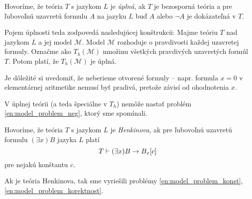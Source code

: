 \begin{definicia}
    Hovoríme, že teória $T$ s jazykom $L$ je \emph{úplná}, ak $T$ je
    bezosporná teória a pre ľubovoľnú uzavretú formulu $A$ na jazyku
    $L$ buď $A$ alebo $\neg A$ je dokázateľná v $T$.
\end{definicia}

\begin{poznamka}
    Pojem úplnosti teda zodpovedá nasledujúcej konštrukcii:
    Majme teóriu $T$ nad jazykom $L$ a jej model $\mathcal{M}$.
    Model $\mathcal{M}$ rozhoduje o pravdivosti každej uzavretej
    formuly.
    Označme ako $T_h(\mathcal{M})$ množinu všetkých
    pravdivých uzavretých formúl $T$.
    Potom platí, že $T_h(\mathcal{M})$ je úplná.

    Je dôležité si uvedomiť, že neberieme otvorené formuly --
    napr. formula $x=0$ v elementárnej aritmetike nemusí byť pradivá, 
    pretože závisí od ohodnotenia $x$.
\end{poznamka}

\begin{poznamka}
    V úplnej teórii (a teda špeciálne v $T_h$) nemôže nastať problém 
    \ref{en:model_problem_neg}, ktorý sme spomínali.
\end{poznamka}

\begin{definicia}
    Hovoríme, že teória $T$ s jazykom $L$ je \emph{Henkinova}, ak pre
    ľubovoľnú uzavretú formulu $(\exists x)B$ jazyka $L$ platí
    \begin{equation*}
        T \vdash (\exists x)B \rightarrow B_x[c]
    \end{equation*}
    pre nejakú konštantu $c$.
\end{definicia}

\begin{poznamka}
    Ak je teória Henkinova, tak sme vyriešili problémy
    \ref{en:model_problem_konst}, \ref{en:model_problem_korektnost}.
\end{poznamka}

